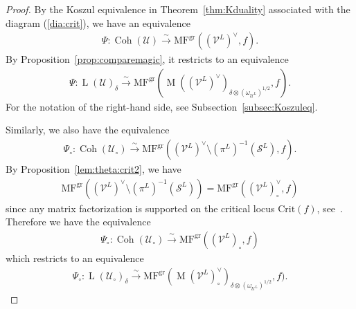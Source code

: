 \documentclass [11pt,oneside,a4paper,mathscr]{amsart}
\theoremstyle{definition}
\newcommand{\sS}{\mathcal{S}}
\newcommand{\U}{\mathcal{U}}
\newcommand{\V}{\mathcal{V}}
\newcommand{\LL}{\operatorname{L}}
\newcommand{\MM}{\operatorname{M}}
\newcommand{\Coh}{\operatorname{Coh}}
\begin{document}
\begin{proof}
By the Koszul equivalence in Theorem~\ref{thm:Kduality} 
associated with the diagram (\ref{dia:crit}), we have an equivalence
\begin{align*}
    \Psi \colon \Coh(\U) \stackrel{\sim}{\to} \mathrm{MF}^{\mathrm{gr}}((\V^L)^{\vee}, f). 
\end{align*}
By Proposition~\ref{prop:comparemagic}, it restricts to an equivalence
\begin{align*}
\Psi \colon \LL(\mathcal{U})_{\delta}\stackrel{\sim}{\to}
\mathrm{MF}^{\mathrm{gr}}(\MM((\mathcal{V}^L)^{\vee})_{\delta\otimes (\omega_{\mathcal{U}^L})^{1/2}}, f). 
    \end{align*}
 For the notation of the right-hand side, see Subsection~\ref{subsec:Koszuleq}.
 
Similarly, we also have the equivalence 
\begin{align*}
	\Psi_{\circ} \colon \Coh(\U_{\circ}) \stackrel{\sim}{\to}
	\mathrm{MF}^{\mathrm{gr}}((\V^L)^{\vee} \setminus (\pi^L)^{-1}(\sS^L), f). 
	\end{align*}
By Proposition~\ref{lem:theta:crit2}, we have 
\begin{align*}
		\mathrm{MF}^{\mathrm{gr}}((\V^L)^{\vee} \setminus (\pi^L)^{-1}(\sS^L))
	=
	\mathrm{MF}^{\mathrm{gr}}((\V^L)^{\vee}_{\circ}, f)
	\end{align*}
since any matrix factorization is supported on the critical locus $\mathrm{Crit}(f)$, 
see~\cite[Corollary~3.18]{MR3112502}. 
Therefore we have the equivalence 
\begin{align*}
	\Psi_{\circ} \colon \Coh(\mathcal{U}_{\circ}) \stackrel{\sim}{\to}
	\mathrm{MF}^{\mathrm{gr}}((\V^L)_{\circ}, f)	
	\end{align*}
which restricts to an equivalence 
\begin{align*}
	\Psi_{\circ} \colon \LL(\U_{\circ})_{\delta} \stackrel{\sim}{\to}
	\mathrm{MF}^{\mathrm{gr}}(\MM(\V^L)^{\vee}_{\circ})_{\delta\otimes (\omega_{\U^L})^{1/2}}, f).
	\end{align*}
    

\end{proof}
\end{document}

